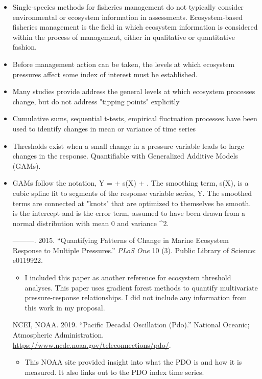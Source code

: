 \begin{itemize}
\tightlist
  \item
    Single-species methods for fisheries management do not typically consider environmental or ecosystem information in assessments. Ecosystem-based fisheries management is the field in which ecosystem information is considered within the process of management, either in qualitative or quantitative fashion. 
  \item
    Before management action can be taken, the levels at which ecosystem pressures affect some index of interest must be established. 
  \item
    Many studies provide address the general levels at which ecosystem processes change, but do not address "tipping points" explicitly
  \item
    Cumulative sums, sequential t-tests, empirical fluctuation processes have been used to identify changes in mean or variance of time series
  \item
    Thresholds exist when a small change in a pressure variable leads to large changes in the response. Quantifiable with Generalized Additive Models (GAMs).
  \item
    GAMs follow the notation, Y = \alpha + s(X) + \epsilon. The smoothing term, s(X), is a cubic spline fit to segments of the response variable series, Y. The smoothed terms are connected at "knots" that are optimized to themselves be smooth. \alpha is the intercept and \epsilon is the error term, assumed to have been drawn from a normal distribution with mean 0 and variance \sigma^2.

\hypertarget{ref-large2015}{}
---------. 2015. ``Quantifying Patterns of Change in Marine Ecosystem
Response to Multiple Pressures.'' \emph{PLoS One} 10 (3). Public Library
of Science: e0119922.

\begin{itemize}
\tightlist
  \item
    I included this paper as another reference for ecosystem threshold analyses. This paper uses gradient forest methods to quantify multivariate pressure-response relationships. I did not include any information from this work in my proposal.  
\end{itemize}


\hypertarget{ref-ncei2019}{}
NCEI, NOAA. 2019. ``Pacific Decadal Oscillation (Pdo).'' National
Oceanic; Atmospheric Administration.
\url{https://www.ncdc.noaa.gov/teleconnections/pdo/}.

\begin{itemize}
\tightlist
  \item
    This NOAA site provided insight into what the PDO is and how it is measured. It also links out to the PDO index time series.
\end{itemize}


\end{itemize}
